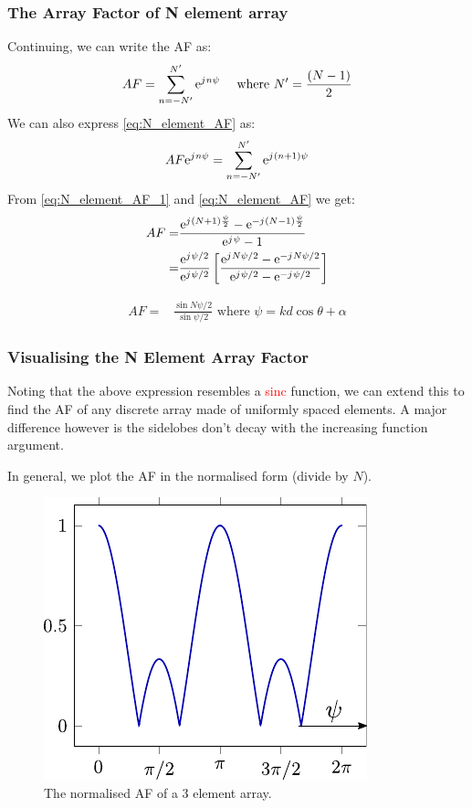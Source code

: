 \documentclass[10pt]{beamer}
\newcommand{\e}{\mathrm{e}} %
\renewcommand{\j}{{j}\mkern1mu} %
\begin{document}
\begin{frame}[fragile]
    \frametitle{The Array Factor of N element array}
Continuing, we can write the AF as:
\small
\begin{equation}
    AF=\sum_{n=-N'}^{N'} \e^{\j n \psi} \quad \text { where } N' =\frac{(N-1)}{2}
    \label{eq:N_element_AF}
\end{equation}
\normalsize
We can also express \eqref{eq:N_element_AF} as:
\small
\begin{equation}
    AF \e^{\j n \psi} =\sum_{n=-N'}^{N'} \e^{\j (n+1) \psi}
    \label{eq:N_element_AF_1}
\end{equation}
\normalsize
From  \eqref{eq:N_element_AF_1} and \eqref{eq:N_element_AF} we get:
\small
\begin{align*}
    AF {}=& \frac{\e^{\j (N+1)\frac{\psi}{2}} - \e^{-\j (N-1)\frac{\psi}{2}}}{\e^{\j \psi} - 1} \\
    {}=& \frac{\e^{\j \psi/2 }}{\e^{\j \psi/2 }} \left[\frac{\e^{\j N\psi/2} - \e^{-\j N\psi/2}}{\e^{\j \psi/2} - \e^{-\j \psi/2}}\right]
\end{align*}
\normalsize
\begin{tcolorbox}[colback=blue!5]
    \begin{align*}
        AF {}=& \frac{\sin N \psi/2 }{\sin \psi/2 } \text { where } \psi =k d \cos \theta + \alpha
    \end{align*}
  \end{tcolorbox}
\end{frame}


\begin{frame}
    \frametitle{Visualising the N Element Array Factor}
Noting that the above expression resembles a \textcolor{red}{sinc} function, we can extend this to find the AF of any discrete array made of uniformly spaced elements. A major difference however is the sidelobes don't decay with the increasing function argument.

In general, we plot the AF in the normalised form (divide by $N$).

\begin{figure}[h!]
    \centering
    \includegraphics[width=.5\textwidth]{sinc.pdf}
    \caption{The normalised AF of a 3 element array.}
    \label{fig:3_element}
\end{figure} 
\end{frame}
\end{document}

